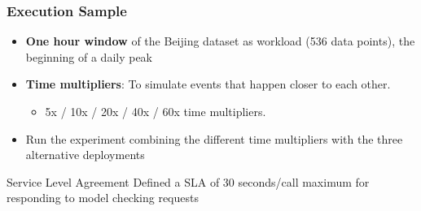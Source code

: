 \documentclass[pdf,10pt]{beamer}
\begin{document}
\begin{frame}\frametitle{Execution Sample}


\begin{itemize}
\item \textbf{One hour window} of the Beijing dataset as workload (536 data points), the beginning of a daily peak 
\item \textbf{Time multipliers}: To simulate events that happen closer to each other.
    \begin{itemize}
    \item  5x / 10x / 20x / 40x / 60x time multipliers.
\end{itemize}

\item Run the experiment combining the different time multipliers with the three alternative deployments
\end{itemize}

\begin{exampleblock}{Service Level Agreement }
Defined a SLA of 30 seconds/call maximum for responding to model checking requests
\end{exampleblock}
\end{frame}
\end{document}

